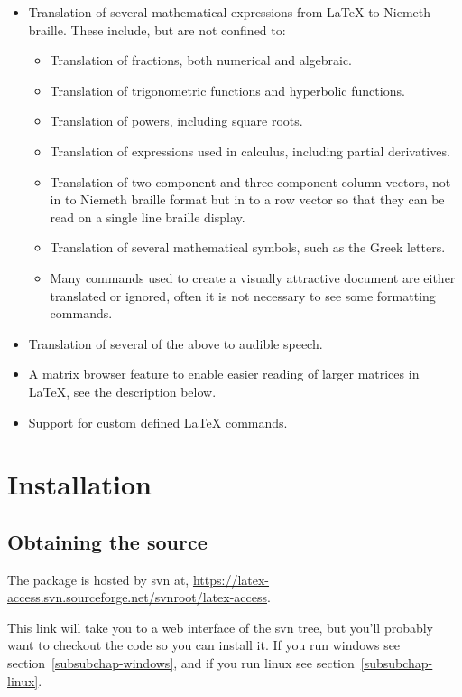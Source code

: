 \documentclass[12pt,a4paper]{report}
\begin{document}
\begin{itemize}
\item Translation of several mathematical expressions from LaTeX to
Niemeth braille. These include, but are not confined
to:
\begin{itemize}
\item Translation of fractions, both numerical and
algebraic.
\item Translation of trigonometric
functions and hyperbolic functions.
\item Translation of powers,
including square roots.
\item Translation of
expressions used in calculus, including partial derivatives.
\item Translation of two component and three component column vectors,
  not in to Niemeth braille format but in to a row vector so that they
  can be read on a single line braille display.
\item Translation of several mathematical symbols, such as the Greek letters.
\item Many commands used to create a visually attractive document are
  either translated or ignored, often it is not necessary to see some
  formatting commands.
\end{itemize}

\item Translation of several of the above to audible speech.
\item A matrix browser feature to enable easier reading of larger
  matrices in LaTeX, see the description below.
\item Support for custom defined LaTeX commands.
\end{itemize}

\chapter{Installation}
\label{ch-installation}

\section{Obtaining the source}
\label{subchap-obtaining-source}
The package is hosted by svn at,
\url{https://latex-access.svn.sourceforge.net/svnroot/latex-access}.

This link will take you to a web interface of the svn tree, but you'll
probably want to checkout the code so you can install it. If you run
windows see section~\ref{subsubchap-windows}, and if you run linux
see section~\ref{subsubchap-linux}.
\end{document}
